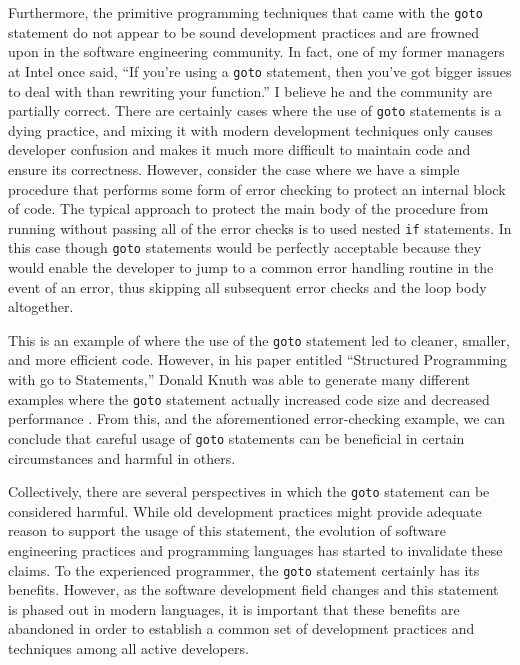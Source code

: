 \documentclass[12pt,letterpaper]{article}
\begin{document}
Furthermore, the primitive programming techniques that came with the {\tt goto} statement do not
appear to be sound development practices and are frowned upon in the software 
engineering community. In fact, one of my former managers at Intel once said, ``If you're using a 
{\tt goto} statement, then you've got bigger issues to deal with than rewriting your function.'' 
I believe he and the community are partially correct. There are certainly cases where the use of 
{\tt goto} statements is a dying practice, and mixing it with modern development techniques only causes developer confusion and makes it much more difficult to maintain code and ensure its correctness. 
However, consider the case where we have a simple procedure that performs some form of error checking to protect an internal block of code.
The typical approach to protect the main body of the procedure from running without passing all of the error checks is to used nested {\tt if} statements. In this case though {\tt goto} statements would be perfectly acceptable
because they would enable the developer to jump to a common error handling routine in the event of 
an error, thus skipping all subsequent error checks and the loop body altogether. 

This is an example of where the use of the {\tt goto} statement led to cleaner, smaller, and more
efficient code. However, in his paper entitled ``Structured Programming with go to Statements,'' Donald 
Knuth was able to generate many different examples where the {\tt goto} statement actually increased code 
size and decreased performance \cite{Knuth1974}. From this, and the aforementioned error-checking 
example, we can conclude that careful usage of {\tt goto} statements can be beneficial in certain
circumstances and harmful in others. 

Collectively, there are several perspectives in which the {\tt goto} statement can be considered
harmful. While old development practices might provide adequate reason to support the usage of
this statement, the evolution of software engineering practices and programming languages 
has started to invalidate these claims. To the experienced programmer, the {\tt goto} statement
certainly has its benefits. However, as the software development field changes and this statement
is phased out in modern languages, it is important that these benefits are abandoned in order
to establish a common set of development practices and techniques among all active developers. 





\end{document}

